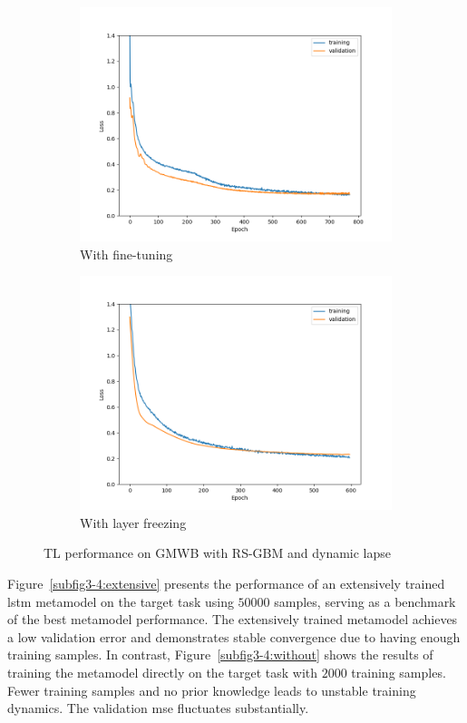\begin{figure}[ht!]
\begin{subfigure}{0.48\textwidth}
        \includegraphics[width=\textwidth]{./project3/figures/figure4c.png}
        \caption{With fine-tuning}
        \label{subfig3-4:fineTuning}
    \end{subfigure}\hfill
    \begin{subfigure}{0.48\textwidth}
        \includegraphics[width=\textwidth]{./project3/figures/figure4d.png}
        \caption{With layer freezing}
        \label{subfig3-4:layerFreezing}
    \end{subfigure}
    \caption{TL performance on GMWB with RS-GBM and dynamic lapse}
    \label{fig3:figure4}
\end{figure}

Figure~\ref{subfig3-4:extensive} presents the performance of an extensively trained \gls{lstm} metamodel on the target task using $\num{50000}$ samples, serving as a benchmark of the best metamodel performance. 
The extensively trained metamodel achieves a low validation error and demonstrates stable convergence due to having enough training samples. 
In contrast, Figure~\ref{subfig3-4:without} shows the results of training the metamodel directly on the target task with $\num{2000}$ training samples. 
Fewer training samples and no prior knowledge leads to unstable training dynamics. 
The validation \gls{mse} fluctuates substantially.


